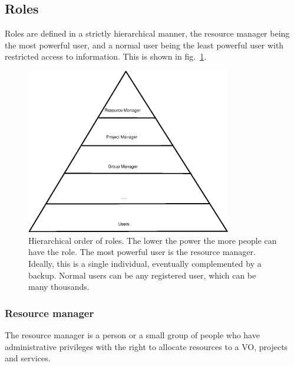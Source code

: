 \documentclass[12pt]{article}
\begin{document}
\subsection{Roles}
Roles are defined in a strictly hierarchical manner, the resource manager being the most powerful user, and a normal user being the least powerful user with restricted access to information. This is shown in fig.~\ref{pyramide}.

\begin{figure}
\begin{center}
\includegraphics[width=0.8\textwidth]{pyramide.eps}
\caption{\label{pyramide} Hierarchical order of roles. The lower the power the more people can have the role. The most powerful user is the resource manager. Ideally, this is a single individual, eventually complemented by a backup. Normal users can be any registered user, which can be many thousands.}
\end{center}
\end{figure}
 
\subsubsection{Resource manager}
The resource manager is a person or a small group of people who have administrative privileges with the right to allocate resources to a VO, projects and services. 
\end{document}

